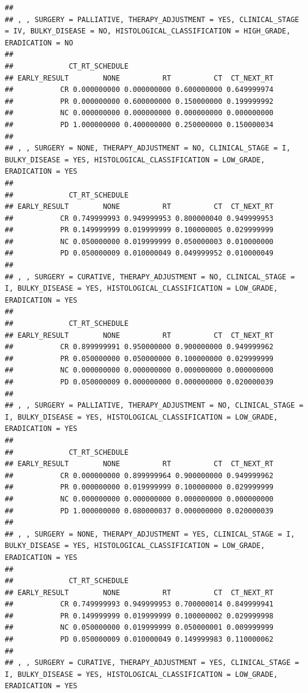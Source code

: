 \documentclass[]{article}
\begin{document}
\begin{verbatim}
## 
## , , SURGERY = PALLIATIVE, THERAPY_ADJUSTMENT = YES, CLINICAL_STAGE = IV, BULKY_DISEASE = NO, HISTOLOGICAL_CLASSIFICATION = HIGH_GRADE, ERADICATION = NO
## 
##             CT_RT_SCHEDULE
## EARLY_RESULT        NONE          RT          CT  CT_NEXT_RT
##           CR 0.000000000 0.000000000 0.600000000 0.649999974
##           PR 0.000000000 0.600000000 0.150000000 0.199999992
##           NC 0.000000000 0.000000000 0.000000000 0.000000000
##           PD 1.000000000 0.400000000 0.250000000 0.150000034
## 
## , , SURGERY = NONE, THERAPY_ADJUSTMENT = NO, CLINICAL_STAGE = I, BULKY_DISEASE = YES, HISTOLOGICAL_CLASSIFICATION = LOW_GRADE, ERADICATION = YES
## 
##             CT_RT_SCHEDULE
## EARLY_RESULT        NONE          RT          CT  CT_NEXT_RT
##           CR 0.749999993 0.949999953 0.800000040 0.949999953
##           PR 0.149999999 0.019999999 0.100000005 0.029999999
##           NC 0.050000000 0.019999999 0.050000003 0.010000000
##           PD 0.050000009 0.010000049 0.049999952 0.010000049
## 
## , , SURGERY = CURATIVE, THERAPY_ADJUSTMENT = NO, CLINICAL_STAGE = I, BULKY_DISEASE = YES, HISTOLOGICAL_CLASSIFICATION = LOW_GRADE, ERADICATION = YES
## 
##             CT_RT_SCHEDULE
## EARLY_RESULT        NONE          RT          CT  CT_NEXT_RT
##           CR 0.899999991 0.950000000 0.900000000 0.949999962
##           PR 0.050000000 0.050000000 0.100000000 0.029999999
##           NC 0.000000000 0.000000000 0.000000000 0.000000000
##           PD 0.050000009 0.000000000 0.000000000 0.020000039
## 
## , , SURGERY = PALLIATIVE, THERAPY_ADJUSTMENT = NO, CLINICAL_STAGE = I, BULKY_DISEASE = YES, HISTOLOGICAL_CLASSIFICATION = LOW_GRADE, ERADICATION = YES
## 
##             CT_RT_SCHEDULE
## EARLY_RESULT        NONE          RT          CT  CT_NEXT_RT
##           CR 0.000000000 0.899999964 0.900000000 0.949999962
##           PR 0.000000000 0.019999999 0.100000000 0.029999999
##           NC 0.000000000 0.000000000 0.000000000 0.000000000
##           PD 1.000000000 0.080000037 0.000000000 0.020000039
## 
## , , SURGERY = NONE, THERAPY_ADJUSTMENT = YES, CLINICAL_STAGE = I, BULKY_DISEASE = YES, HISTOLOGICAL_CLASSIFICATION = LOW_GRADE, ERADICATION = YES
## 
##             CT_RT_SCHEDULE
## EARLY_RESULT        NONE          RT          CT  CT_NEXT_RT
##           CR 0.749999993 0.949999953 0.700000014 0.849999941
##           PR 0.149999999 0.019999999 0.100000002 0.029999998
##           NC 0.050000000 0.019999999 0.050000001 0.009999999
##           PD 0.050000009 0.010000049 0.149999983 0.110000062
## 
## , , SURGERY = CURATIVE, THERAPY_ADJUSTMENT = YES, CLINICAL_STAGE = I, BULKY_DISEASE = YES, HISTOLOGICAL_CLASSIFICATION = LOW_GRADE, ERADICATION = YES

\end{verbatim}
\end{document}
